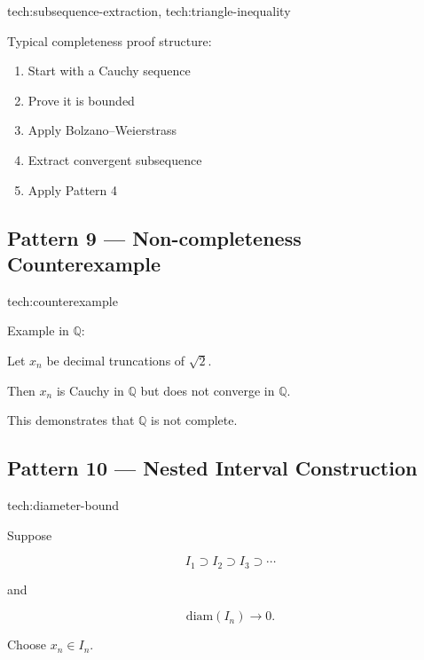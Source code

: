 \begin{remark*}[Techniques]
tech:subsequence-extraction, tech:triangle-inequality
\end{remark*}

Typical completeness proof structure:

\begin{enumerate}
\item Start with a Cauchy sequence
\item Prove it is bounded
\item Apply Bolzano--Weierstrass
\item Extract convergent subsequence
\item Apply Pattern 4
\end{enumerate}

\subsection*{Pattern 9 — Non-completeness Counterexample}

\begin{remark*}[Techniques]
tech:counterexample
\end{remark*}

Example in \(\mathbb{Q}\):

Let \(x_n\) be decimal truncations of \(\sqrt{2}\).

Then \(x_n\) is Cauchy in \(\mathbb{Q}\) but does not converge in
\(\mathbb{Q}\).

This demonstrates that \(\mathbb{Q}\) is not complete.

\subsection*{Pattern 10 — Nested Interval Construction}

\begin{remark*}[Techniques]
tech:diameter-bound
\end{remark*}

Suppose

\[
I_1 \supset I_2 \supset I_3 \supset \cdots
\]

and

\[
\text{diam}(I_n) \to 0.
\]

Choose \(x_n \in I_n\).

